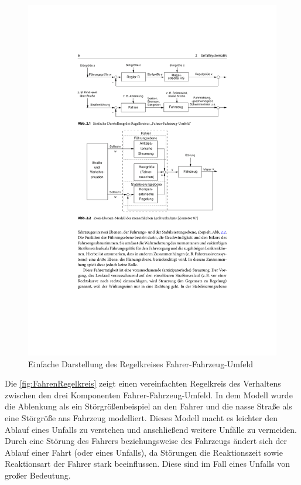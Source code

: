 \begin{figure}
	\centering
	\includegraphics[width=\linewidth]{Bilder/Unfallforschung_1.pdf}
	\caption{Einfache Darstellung des Regelkreises 	\glq Fahrer-Fahrzeug-Umfeld\grq \citep{Appel2002}} 
	\label{fig:FahrenRegelkreis}
\end{figure}

Die \autoref{fig:FahrenRegelkreis} zeigt einen vereinfachten Regelkreis des Verhaltens zwischen den drei Komponenten \glqq Fahrer-Fahrzeug-Umfeld\grqq{}. In dem Modell wurde die Ablenkung als ein Störgrößenbeispiel an den Fahrer und die nasse Straße als eine Störgröße ans Fahrzeug modelliert. Dieses Modell macht es leichter den Ablauf eines Unfalls zu verstehen und anschließend weitere Unfälle zu vermeiden. Durch eine Störung des Fahrers beziehungsweise des Fahrzeugs ändert sich der Ablauf einer Fahrt (oder eines Unfalls), da Störungen die Reaktionszeit sowie Reaktionsart der Fahrer stark beeinflussen. Diese sind im Fall eines Unfalls von großer Bedeutung. \\


